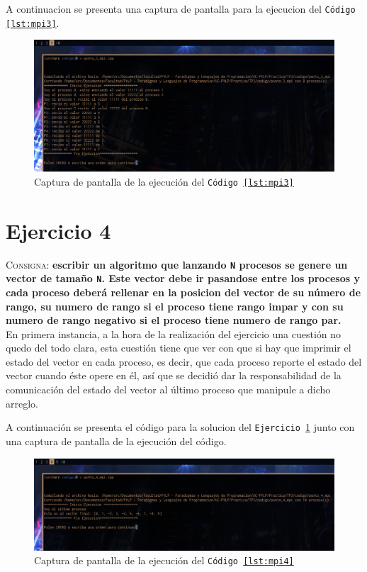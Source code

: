 \documentclass{article}
\begin{document}
A continuacion se presenta una captura de pantalla para la ejecucion del
\texttt{C\'odigo \ref{lst:mpi3}}.

\begin{figure}[H]
  \centering
  \includegraphics[width=.95\linewidth]{EJ3_Captura}
  \caption{Captura de pantalla de la ejecuci\'on del \texttt{C\'odigo
\ref{lst:mpi3}}}
  \label{fig:ej3_captura}
\end{figure}

\section{Ejercicio 4}
\label{sec:ej4}
\textsc{Consigna}: \textbf{escribir un algoritmo que lanzando \texttt{N}
procesos se genere un vector de tamaño \texttt{N}. Este vector debe ir
pasandose entre los procesos y cada proceso deber\'a rellenar en la posicion
del vector de su n\'umero de rango, su numero de rango si el proceso tiene
rango impar y con su numero de rango negativo si el proceso tiene numero de
rango par.}\\

En primera instancia, a la hora de la realización del
ejercicio una cuesti\'on no quedo del todo clara, esta cuesti\'on tiene que
ver con que si hay que imprimir el estado del vector en cada proceso, es
decir, que cada proceso reporte el estado del vector cuando \'este opere en
\'el, as\'i que se decidi\'o dar la responsabilidad de la comunicaci\'on del
estado del vector al \'ultimo proceso que manipule a dicho arreglo.

A continuaci\'on se presenta el c\'odigo para la solucion del \texttt{Ejercicio
\ref{sec:ej4}} junto con una captura de pantalla de la ejecuci\'on del c\'odigo.



\begin{figure}[H]
  \centering
  \includegraphics[width=.95\linewidth]{EJ4_Captura}
  \caption{Captura de pantalla de la ejecuci\'on del \texttt{C\'odigo
\ref{lst:mpi4}}}
  \label{fig:ej4_captura}
\end{figure}
\end{document}
